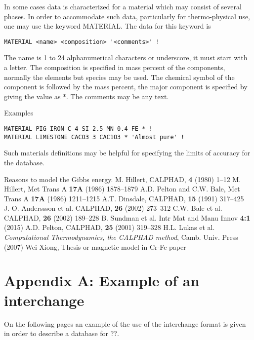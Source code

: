 \documentclass[12pt]{article}
\begin{document}
In some cases data is characterized for a material which may consist
of several phases.  In order to accommodate such data, particularly for
thermo-physical use, one may use the keyword MATERIAL.  The data for this
keyword is

\begin{verbatim}
MATERIAL <name> <composition> '<comments>' !
\end{verbatim}

The name is 1 to 24 alphanumerical characters or underscore, it must
start with a letter.  The composition is specified in mass percent of
the components, normally the elements but species may be used.  The
chemical symbol of the component is followed by the mass percent, the
major component is specified by giving the value as *.  The comments
may be any text.  

Examples

\begin{verbatim}
MATERIAL PIG_IRON C 4 SI 2.5 MN 0.4 FE * !
MATERIAL LIMESTONE CACO3 3 CAC1O3 * 'Almost pure' !
\end{verbatim}

Such materials definitions may be helpful for specifying the limits of
accuracy for the database.

\begin{thebibliography}{00Zzz}
 Reasons to model the Gibbs energy.
 M. Hillert, CALPHAD, {\bf 4} (1980) 1--12
 M. Hillert, Met Trans A {\bf 17A} (1986) 1878--1879
 A.D. Pelton and C.W. Bale, Met Trans A {\bf 17A}
  (1986) 1211--1215
 A.T. Dinsdale, CALPHAD, {\bf 15} (1991) 317--425 
 J.-O. Anderssson et al. CALPHAD, {\bf 26} (2002) 273--312
 C.W. Bale et al. CALPHAD, {\bf 26} (2002) 189--228
 B. Sundman et al. Intr Mat and Manu Innov {\bf 4:1} (2015)
 A.D. Pelton, CALPHAD, {\bf 25} (2001) 319--328
 H.L. Lukas et al. {\em Computational Thermodynamics,
  the CALPHAD method}, Camb. Univ. Press (2007)
 Wei Xiong, Thesis or magnetic model in Cr-Fe paper 
\end{thebibliography}

\newpage

\section{Appendix A: Example of an interchange}

On the following pages an example of the use of the interchange format
is given in order to describe a database for ??.  
\end{document}
